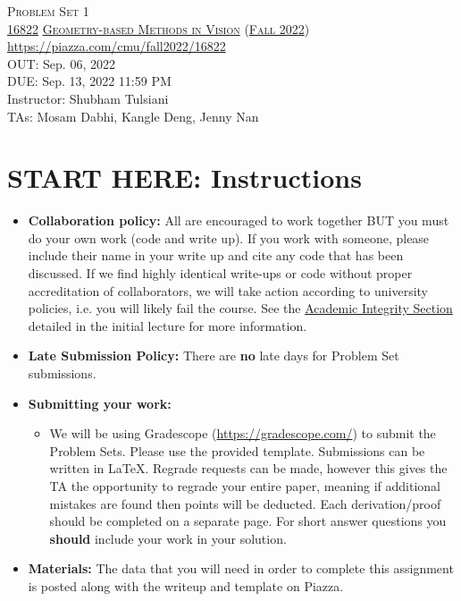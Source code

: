 \documentclass[11pt,addpoints,answers]{exam}
\title{\textsc{\hwName}} %
\author{}
\date{}
\date{}
\numberwithin{equation}{section} %
\numberwithin{figure}{section} %
\numberwithin{table}{section} %
\newcommand{\courseNum}{\href{https://geometric3d.github.io}{16822}}
\newcommand{\courseName}{\href{https://geometric3d.github.io}{Geometry-based Methods in Vision}}
\newcommand{\courseSem}{\href{https://geometric3d.github.io}{Fall 2022}}
\newcommand{\courseUrl}{\url{https://piazza.com/cmu/fall2022/16822}}
\newcommand{\hwNum}{Problem Set 1}
\newcommand{\hwTopic}{Linear Algebra }
\newcommand{\outDate}{Sep. 06, 2022}
\newcommand{\dueDate}{Sep. 13, 2022 11:59 PM}
\newcommand{\instructorName}{Shubham Tulsiani}
\newcommand{\taNames}{Mosam Dabhi, Kangle Deng, Jenny Nan}
\begin{document}
\section*{}
\begin{center}
  \textsc{\LARGE \hwNum} \\
  \vspace{1em}
  \textsc{\large \courseNum{} \courseName{} (\courseSem)} \\
  \courseUrl\\
  \vspace{1em}
  OUT: \outDate \\
  DUE: \dueDate \\
  Instructor: \instructorName \\
  TAs: \taNames
\end{center}

\section*{START HERE: Instructions}
\begin{itemize}
\item \textbf{Collaboration policy:} All are encouraged to work together BUT you must do your own work (code and write up). If you work with someone, please include their name in your write up and cite any code that has been discussed. If we find highly identical write-ups or code without proper accreditation of collaborators, we will take action according to university policies, i.e. you will likely fail the course. See the \href{https://www.dropbox.com/s/z6o0tinc9eaez46/L01_Overview.pdf?dl=0}{Academic Integrity Section} detailed in the initial lecture for more information.

\item\textbf{Late Submission Policy:} There are \textbf{no} late days for Problem Set submissions.

\item\textbf{Submitting your work:}

\begin{itemize}

\item We will be using Gradescope (\url{https://gradescope.com/}) to submit the Problem Sets. Please use the provided template. Submissions can be written in LaTeX. Regrade requests can be made, however this gives the TA the opportunity to regrade your entire paper, meaning if additional mistakes are found then points will be deducted.
Each derivation/proof should be  completed on a separate page. For short answer questions you \textbf{should} include your work in your solution.  
\end{itemize}

\item \textbf{Materials:} The data that you will need in order to complete this assignment is posted along with the writeup and template on Piazza.

\end{itemize}
\end{document}
